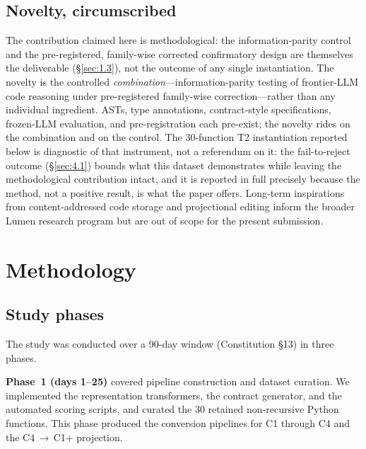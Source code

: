 \documentclass[11pt]{article}
\begin{document}
\subsection{Novelty, circumscribed}
\label{sec:2.4}
The contribution claimed here is methodological: the
information-parity control and the pre-registered, family-wise
corrected confirmatory design are themselves the deliverable
(\S\ref{sec:1.3}), not the outcome of any single instantiation.
The novelty is the controlled \emph{combination}---information-parity
testing of frontier-LLM code reasoning under pre-registered
family-wise correction---rather than any individual ingredient. ASTs,
type annotations, contract-style specifications, frozen-LLM
evaluation, and pre-registration each pre-exist; the novelty rides on
the combination and on the control. The 30-function T2 instantiation
reported below is diagnostic of that instrument, not a referendum on
it: the fail-to-reject outcome (\S\ref{sec:4.1}) bounds what this
dataset demonstrates while leaving the methodological contribution
intact, and it is reported in full precisely because the method, not
a positive result, is what the paper offers. Long-term inspirations
from content-addressed code storage and projectional editing inform
the broader Lumen research program but are out of scope for the
present submission.

\section{Methodology}
\label{sec:3}

\subsection{Study phases}
\label{sec:3.0}
The study was conducted over a 90-day window (Constitution \S13) in
three phases.

\textbf{Phase~1 (days 1--25)} covered pipeline construction and dataset
curation. We implemented the representation transformers, the contract
generator, and the automated scoring scripts, and curated the 30
retained non-recursive Python functions. This phase produced the
conversion pipelines for C1 through C4 and the C4\,$\to$\,C1+
projection.
\end{document}

